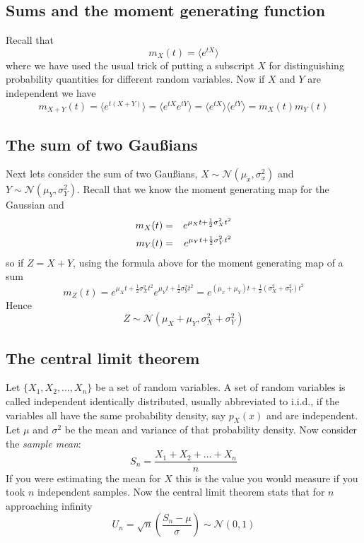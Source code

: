 \documentclass[11pt,a4paper]{scrartcl}
\begin{document}
\subsection*{Sums and the moment generating function}
Recall that
\begin{equation}
m_X(t)=\langle e^{tX}\rangle
\end{equation}
where we have used the usual trick of putting a subscript $X$ for
distinguishing probability quantities for different random variables. Now if $X$ and $Y$ are independent we have
\begin{equation}
m_{X+Y}(t)=\langle e^{t(X+Y)}\rangle=\langle e^{tX}e^{tY}\rangle=\langle e^{tX}\rangle \langle e^{tY}\rangle=m_X(t)m_Y(t)
\end{equation}

\subsection*{The sum of two Gau\ss{}ians}

Next lets consider the sum of two Gau\ss{}ians, $X\sim
\mathcal{N}(\mu_x,\sigma_x^2)$ and $Y\sim
\mathcal{N}(\mu_Y,\sigma_Y^2)$. Recall that we know the moment generating map for the Gaussian and
\begin{eqnarray}
m_X(t)&=&e^{\mu_X t+\frac{1}{2}\sigma_X^2t^2}\cr
m_Y(t)&=&e^{\mu_Y t+\frac{1}{2}\sigma_Y^2t^2}
\end{eqnarray}
so if $Z=X+Y$, using the formula above for the moment generating map
of a sum
\begin{equation}
m_Z(t)=e^{\mu_X t+\frac{1}{2}\sigma_X^2t^2}e^{\mu_Y t+\frac{1}{2}\sigma_Y^2t^2}
=e^{(\mu_x+\mu_Y)t+\frac{1}{2}(\sigma_X^2+\sigma_Y^2)t^2}
\end{equation}
Hence
\begin{equation}
Z\sim \mathcal{N}(\mu_X+\mu_Y,\sigma_X^2+\sigma_Y^2)
\end{equation}

\subsection*{The central limit theorem}

Let $\{X_1,X_2,\ldots,X_n\}$ be a set of random variables. A set of
random variables is called independent identically distributed,
usually abbreviated to i.i.d., if the variables all have the same
probability density, say $p_X(x)$ and are independent. Let $\mu$ and
$\sigma^2$ be the mean and variance of that probability density. Now
consider the \textsl{sample mean}:
\begin{equation}
S_n=\frac{X_1+X_2+\ldots+X_n}{n}
\end{equation}
If you were estimating the mean for $X$ this is the value you would
measure if you took $n$ independent samples. Now the central limit
theorem stats that for $n$ approaching infinity
\begin{equation}
U_n=\sqrt{n}\left(\frac{S_n-\mu}{\sigma}\right) \sim \mathcal{N}(0,1)
\end{equation}
\end{document}
